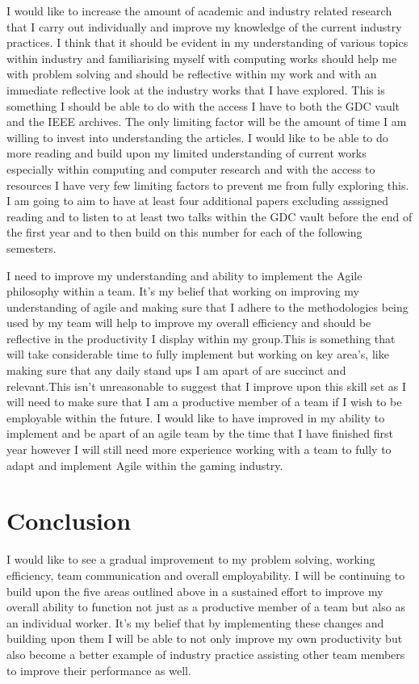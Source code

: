 \documentclass{scrartcl}
\begin{document}
I would like to increase the amount of academic and industry related research that I carry out individually and improve my knowledge of the current industry practices. I think that it should be evident in my understanding of various topics within industry and familiarising myself with computing works should help me with problem solving and should be reflective within my work and with an immediate reflective look at the industry works that I have explored. This is something I should be able to do with the access I have to both the GDC vault and the IEEE archives. The only limiting factor will be the amount of time I am willing to invest into understanding the articles. I would like to be able to do more reading and build upon my limited understanding of current works especially within computing and computer research and with the access to resources I have very few limiting factors to prevent me from fully exploring this. I am going to aim to have at least four additional papers excluding asssigned reading and to listen to at least two talks within the GDC vault before the end of the first year and to then build on this number for each of the following semesters. \linebreak

I need to improve my understanding and ability to implement  the Agile philosophy within a team. It's my belief that working on improving my understanding of agile and making sure that I adhere to the methodologies being used by my team will help to improve my overall efficiency and should be reflective in the productivity I display within my group.This is something that will take considerable time to fully implement but working on key area's, like making sure that any daily stand ups I am apart of are succinct and relevant.This isn't unreasonable to suggest that I improve upon this skill set as I will need to make sure that I am a productive member of a team if I wish to be employable within the future. I would like to have improved in my ability to implement and be apart of an agile team by the time that I have finished first year however I will still need more experience working with a team to fully to adapt and implement Agile within the gaming industry.


\section{Conclusion}

I would like to see a gradual improvement to my problem solving, working efficiency, team communication and  overall employability. I will be continuing to build upon the five areas outlined above in a sustained effort to improve my overall ability to function not just as a productive member of a team but also as an individual worker. It's my belief that by implementing these changes and building upon them I will be able to not only improve my own productivity but also become a better example of industry practice assisting other team members to improve their performance as well.
\end{document}
